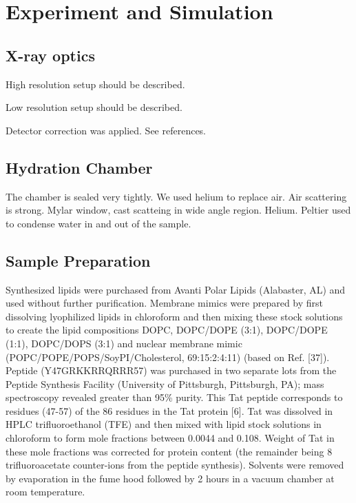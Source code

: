 \chapter{Experiment and Simulation}

\section{X-ray optics}
High resolution setup should be described.

Low resolution setup should be described.

Detector correction was applied. See references.

\section{Hydration Chamber}
The chamber is sealed very tightly. We used helium to replace air. Air 
scattering is strong. 
Mylar window, cast scatteing in wide angle region. Helium. Peltier used to 
condense water in and out of the sample.  

\section{Sample Preparation}
Synthesized lipids were purchased from Avanti Polar Lipids (Alabaster, AL) and 
used without further purification. Membrane mimics were prepared by first 
dissolving lyophilized lipids in chloroform and then mixing these stock 
solutions to create the lipid compositions
DOPC, DOPC/DOPE (3:1), DOPC/DOPE (1:1), DOPC/DOPS (3:1) and nuclear membrane
mimic (POPC/POPE/POPS/SoyPI/Cholesterol, 69:15:2:4:11) (based on Ref. [37]). 
Peptide
(Y47GRKKRRQRRR57) was purchased in two separate lots from the Peptide Synthesis 
Facility
(University of Pittsburgh, Pittsburgh, PA); mass spectroscopy revealed greater
than 95\% 
purity. This Tat
peptide corresponds to residues (47-57) of the 86 residues in the Tat 
protein [6]. Tat was
dissolved in HPLC trifluoroethanol (TFE) and then mixed with lipid stock 
solutions in
chloroform to form mole fractions between 0.0044 and 0.108. Weight of Tat in 
these mole
fractions was corrected for protein content (the remainder being 8 
trifluoroacetate counter-ions
from the peptide synthesis). Solvents were removed by evaporation in the fume 
hood followed
by 2 hours in a vacuum chamber at room temperature.

